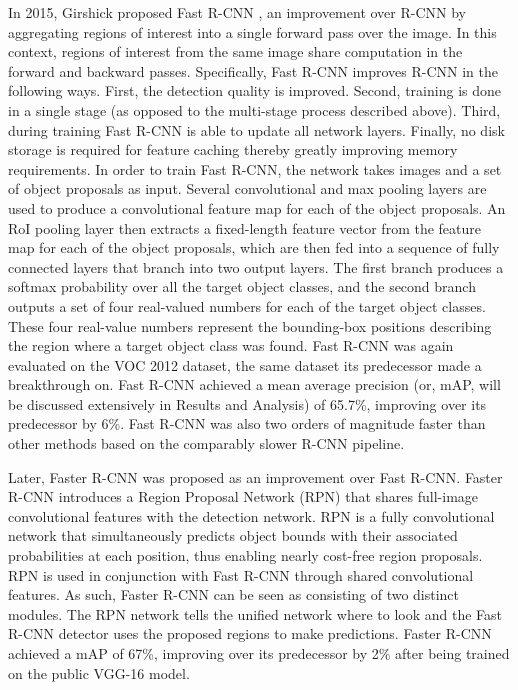 \documentclass[conference]{IEEEtran}
\begin{document}
In 2015, Girshick proposed Fast R-CNN \cite{girshick2015fast}, an improvement over R-CNN by aggregating regions of interest into a single forward pass over the image. In this context, regions of interest from the same image share computation in the forward and backward passes. Specifically, Fast R-CNN improves R-CNN in the following ways. First, the detection quality is improved. Second, training is done in a single stage (as opposed to the multi-stage process described above). Third, during training Fast R-CNN is able to update all network layers. Finally, no disk storage is required for feature caching thereby greatly improving memory requirements. In order to train Fast R-CNN, the network takes images and a set of object proposals as input. Several convolutional and max pooling layers are used to produce a convolutional feature map for each of the object proposals. An RoI pooling layer then extracts a fixed-length feature vector from the feature map for each of the object proposals, which are then fed into a sequence of fully connected layers that branch into two output layers. The first branch produces a softmax probability over all the target object classes, and the second branch outputs a set of four real-valued numbers for each of the target object classes. These four real-value numbers represent the bounding-box positions describing the region where a target object class was found. Fast R-CNN was again evaluated on the VOC 2012 dataset, the same dataset its predecessor made a breakthrough on. Fast R-CNN achieved a mean average precision (or, mAP, will be discussed extensively in Results and Analysis) of 65.7\%, improving over its predecessor by 6\%. Fast R-CNN was also two orders of magnitude faster than other methods based on the comparably slower R-CNN pipeline.

Later, Faster R-CNN \cite{ren2015faster} was proposed as an improvement over Fast R-CNN. Faster R-CNN introduces a Region Proposal Network (RPN) that shares full-image convolutional features with the detection network. RPN is a fully convolutional network that simultaneously predicts object bounds with their associated probabilities at each position, thus enabling nearly cost-free region proposals. RPN is used in conjunction with Fast R-CNN through shared convolutional features. As such, Faster R-CNN can be seen as consisting of two distinct modules. The RPN network tells the unified network where to look and the Fast R-CNN detector uses the proposed regions to make predictions. Faster R-CNN achieved a mAP of 67\%, improving over its predecessor by 2\% after being trained on the public VGG-16 model.
\end{document}
